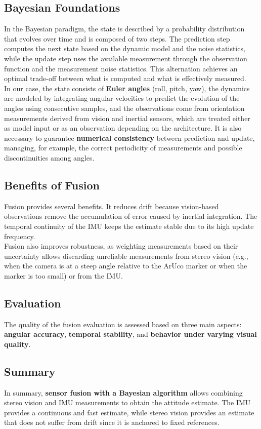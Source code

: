 \subsection*{Bayesian Foundations}
In the Bayesian paradigm, the state is described by a probability distribution that evolves over time and is composed of two steps. The prediction step computes the next state based on the dynamic model and the noise statistics, while the update step uses the available measurement through the observation function and the measurement noise statistics. This alternation achieves an optimal trade-off between what is computed and what is effectively measured. 
\\In our case, the state consists of \textbf{Euler angles} (roll, pitch, yaw), the dynamics are modeled by integrating angular velocities to predict the evolution of the angles using consecutive samples, and the observations come from orientation measurements derived from vision and inertial sensors, which are treated either as model input or as an observation depending on the architecture. It is also necessary to guarantee \textbf{numerical consistency} between prediction and update, managing, for example, the correct periodicity of measurements and possible discontinuities among angles.

\subsection*{Benefits of Fusion}
Fusion provides several benefits. It reduces drift because vision-based observations remove the accumulation of error caused by inertial integration. The temporal continuity of the IMU keeps the estimate stable due to its high update frequency. \\Fusion also improves robustness, as weighting measurements based on their uncertainty allows discarding unreliable measurements from stereo vision (e.g., when the camera is at a steep angle relative to the ArUco marker or when the marker is too small) or from the IMU.


\subsection*{Evaluation}
The quality of the fusion evaluation is assessed based on three main aspects: \textbf{angular accuracy}, \textbf{temporal stability}, and \textbf{behavior under varying visual quality}.


\subsection*{Summary}
In summary, \textbf{sensor fusion with a Bayesian algorithm} allows combining stereo vision and IMU measurements to obtain the attitude estimate. The IMU provides a continuous and fast estimate, while stereo vision provides an estimate that does not suffer from drift since it is anchored to fixed references.


